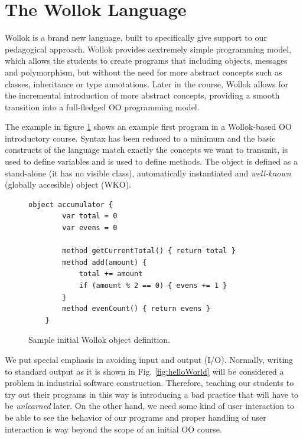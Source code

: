 \section{The Wollok Language}
\label{sec:wollokLanguage}


Wollok is a brand new language, built to specifically give support to our pedagogical approach. 
Wollok provides aextremely simple programming model, which allows the students to create programs that including objects, messages and polymorphism, but without the need for more abstract concepts such as classes, inheritance or type annotations.
Later in the course, Wollok allows for the incremental introduction of more abstract concepts,
providing a smooth transition into a full-fledged OO programming model.

The example in figure \ref{fig:helloWorld/wollok} shows an example first program in a Wollok-based OO introductory course.
Syntax has been reduced to a minimum and the basic constructs of the language match exactly the concepts we want to transmit, \eg {} is used to define variables and  is used to define methods.
The  object is defined as a stand-alone (\ie it has no visible class), automatically instantiated and \emph{well-known} (\ie globally accesible) object (WKO).

\begin{figure}[ht]
 \centering
 \begin{lstlisting}[language=Wollok]
	object accumulator {
		var total = 0
		var evens = 0
		
		method getCurrentTotal() { return total }
		method add(amount) { 
			total += amount 
			if (amount % 2 == 0) { evens += 1 }
		}
		method evenCount() { return evens }
	}
 \end{lstlisting}
 
 \caption{\small Sample initial Wollok object definition.}
 \label{fig:helloWorld/wollok}
\end{figure}

\medskip 

We put special emphasis in avoiding input and output (I/O). 
Normally, writing to standard output as it is shown in Fig. \ref{fig:helloWorld} will be considered a problem in industrial software construction.
Therefore, teaching our students to try out their programs in this way is introducing a bad practice that will have to be \emph{unlearned} later.
On the other hand, we need some kind of user interaction to be able to see the behavior of our programs and proper handling of user interaction is way beyond the scope of an initial OO course.

